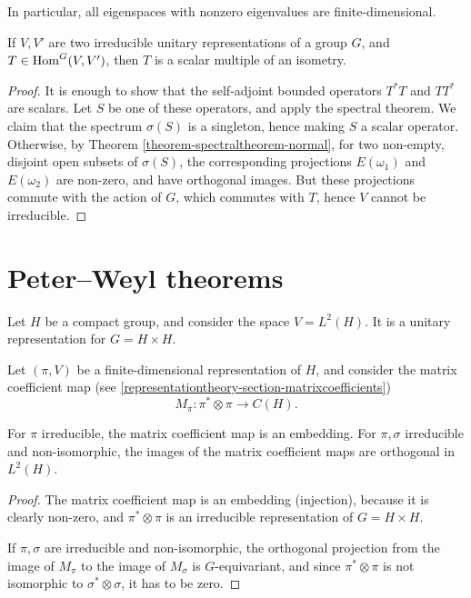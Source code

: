 In particular, all eigenspaces with nonzero eigenvalues are finite-dimensional.


\begin{theorem}
\label{theorem-Schurslemma}
 If $V, V'$ are two irreducible unitary representations of a group $G$, and $T \in \mathop{\rm Hom}\nolimits^G(V,V')$, then $T$ is a scalar multiple of an isometry.
\end{theorem}

\begin{proof}
 It is enough to show that the self-adjoint bounded operators $T^* T$ and $T T^*$ are scalars. Let $S$ be one of these operators, and apply the spectral theorem. We claim that the spectrum $\sigma(S)$ is a singleton, hence making $S$ a scalar operator. Otherwise, by Theorem \ref{theorem-spectraltheorem-normal}, for two non-empty, disjoint open subsets of $\sigma(S)$, the corresponding projections $E(\omega_1)$ and $E(\omega_2)$ are non-zero, and have orthogonal images. But these projections commute with the action of $G$, which commutes with $T$, hence $V$ cannot be irreducible.
\end{proof}



\section{Peter--Weyl theorems} 
\label{section-PeterWeyl}

Let $H$ be a compact group, and consider the space $V=L^2(H)$. It is a unitary representation for $G=H\times H$. 

Let $(\pi, V)$ be a finite-dimensional representation of $H$, and consider the matrix coefficient map (see \ref{representationtheory-section-matrixcoefficients})
$$ M_\pi: \pi^*\otimes \pi \to C(H).$$

\begin{lemma}
\label{lemma-matrixcoefficient}
For $\pi$ irreducible, the matrix coefficient map is an embedding. For $\pi, \sigma$ irreducible and non-isomorphic, the images of the matrix coefficient maps are orthogonal in $L^2(H)$.
\end{lemma}

\begin{proof}
 The matrix coefficient map is an embedding (injection), because it is clearly non-zero, and $\pi^*\otimes\pi$ is an irreducible representation of $G=H\times H$.
 
 If $\pi, \sigma$ are irreducible and non-isomorphic, the orthogonal projection from the image of $M_\pi$ to the image of $M_\sigma$ is $G$-equivariant, and since $\pi^*\otimes \pi$ is not isomorphic to $\sigma^*\otimes \sigma$, it has to be zero.
\end{proof}


